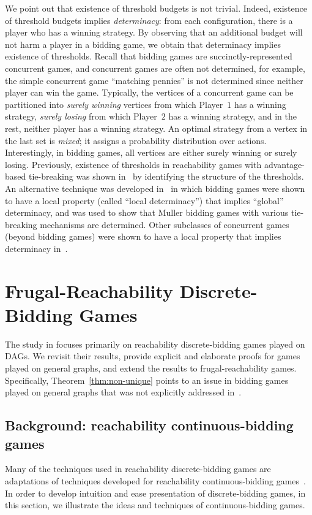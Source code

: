 \documentclass{theoretics}
\newcommand{\PO}{Player~$1$\xspace}
\newcommand{\PT}{Player~$2$\xspace}
\begin{document}
\begin{remark}
We point out that existence of threshold budgets is not trivial. 
Indeed, existence of threshold budgets implies {\em determinacy}: from each configuration, there is a player who has a winning strategy. 
By observing that an additional budget will not harm a player in a bidding game, we obtain that determinacy implies existence of thresholds.
Recall that bidding games are succinctly-represented concurrent games, and concurrent games are often not determined, for example, the simple concurrent game ``matching pennies'' is not determined since neither player can win the game. 
Typically, the vertices of a concurrent game can be partitioned into {\em surely winning} vertices from which \PO has a winning strategy, {\em surely losing} from which \PT has a winning strategy, and in the rest, neither player has a winning strategy. An optimal strategy from a vertex in the last set is {\em mixed}; it assigns a probability distribution over actions. 
Interestingly, in bidding games, all vertices are either surely winning or surely losing. 
Previously, existence of thresholds in reachability games with advantage-based tie-breaking was shown in~\cite{DP10} by identifying the structure of the thresholds. An alternative technique was developed in~\cite{AAH21} in which bidding games were shown to have a local property (called ``local determinacy'') that implies ``global'' determinacy, and was used to show that Muller bidding games with various tie-breaking mechanisms are determined. Other subclasses of concurrent games (beyond bidding games) were shown to have a local property that implies determinacy in~\cite{BBR21}.
\end{remark}


\section{Frugal-Reachability Discrete-Bidding Games}
The study in \cite{DP10} focuses primarily on reachability discrete-bidding games played on DAGs. 
We revisit their results, provide explicit and elaborate proofs for games played on general graphs, and extend the results to frugal-reachability games. 
Specifically, Theorem~\ref{thm:non-unique} points to an issue in bidding games played on general graphs that was not explicitly addressed in~\cite{DP10}.




\subsection{Background: reachability continuous-bidding games}
Many of the techniques used in reachability discrete-bidding games are adaptations of techniques developed for reachability continuous-bidding games~\cite{LLPU96,LLPSU99}. 
In order to develop intuition and ease presentation of discrete-bidding games, in this section, we illustrate the ideas and techniques of continuous-bidding games.
\end{document}
